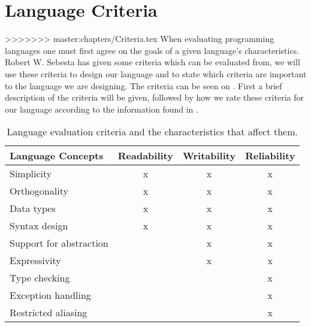\chapter{Language Criteria} %
\label{cha:language_criteria}
>>>>>>> master:chapters/Criteria.tex
When evaluating programming languages one must first agree on the goals of a given language's characteristics.
Robert W. Sebesta has given some criteria which can be evaluated from, we will use these criteria to design our language and to state which criteria are important to the language we are designing.\citep{Sebesta}
The criteria can be seen on .
First a brief description of the criteria will be given, followed by how we rate these criteria for our language according to the information found in .
\begin{table}[h]
	\centering
	\begin{tabular}{|l|c|c|c|}
	\hline
	\textbf{Language Concepts} & \textbf{Readability}  & \textbf{Writability} & \textbf{Reliability}   \\ \hline
	Simplicity                 & x      		       & x             		  & x           		   \\ \hline
	Orthogonality              & x 				       & x             		  & x           		   \\ \hline
	Data types                 & x 				       & x             		  & x           		   \\ \hline
	Syntax design              & x 				       & x             		  & x           		   \\ \hline
	Support for abstraction    &                       & x             		  & x           		   \\ \hline
	Expressivity               &                       & x             		  & x           		   \\ \hline
	Type checking              &                       &               		  & x           		   \\ \hline
	Exception handling         &                       &               		  & x           		   \\ \hline
	Restricted aliasing        &                       &               		  & x           		   \\ \hline
	\end{tabular}
	\caption{Language evaluation criteria and the characteristics that affect them.}\label{tbl:concepts}
\end{table}

